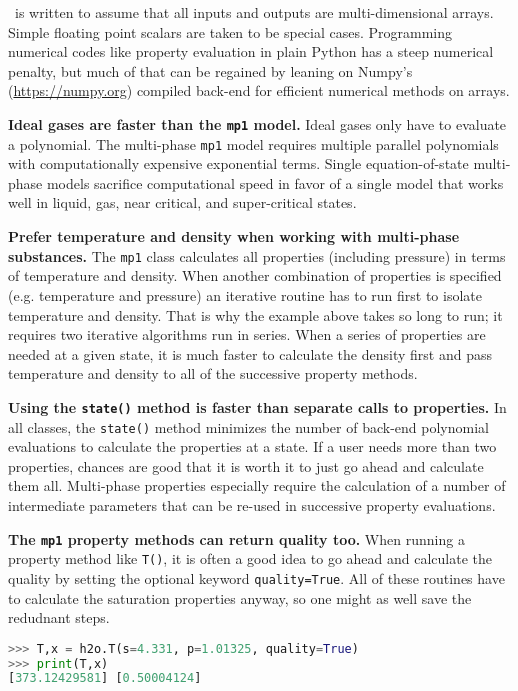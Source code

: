 \PM\ is written to assume that all inputs and outputs are multi-dimensional arrays.  Simple floating point scalars are taken to be special cases.  Programming numerical codes like property evaluation in plain Python has a steep numerical penalty, but much of that can be regained by leaning on Numpy's (\url{https://numpy.org}) compiled back-end for efficient numerical methods on arrays.

{\bf Ideal gases are faster than the \texttt{mp1} model.}  Ideal gases only have to evaluate a polynomial.  The multi-phase \texttt{mp1} model requires multiple parallel polynomials with computationally expensive exponential terms.  Single equation-of-state multi-phase models sacrifice computational speed in favor of a single model that works well in liquid, gas, near critical, and super-critical states.

{\bf Prefer temperature and density when working with multi-phase substances.}  The \texttt{mp1} class calculates all properties (including pressure) in terms of temperature and density.  When another combination of properties is specified (e.g. temperature and pressure) an iterative routine has to run first to isolate temperature and density.  That is why the example above takes so long to run; it requires two iterative algorithms run in series.  When a series of properties are needed at a given state, it is much faster to calculate the density first and pass temperature and density to all of the successive property methods.

{\bf Using the \texttt{state()} method is faster than separate calls to properties.}  In all classes, the \verb|state()| method minimizes the number of back-end polynomial evaluations to calculate the properties at a state.  If a user needs more than two properties, chances are good that it is worth it to just go ahead and calculate them all.  Multi-phase properties especially require the calculation of a number of intermediate parameters that can be re-used in successive property evaluations.

{\bf The \texttt{mp1} property methods can return quality too.}  When running a property method like \verb|T()|, it is often a good idea to go ahead and calculate the quality by setting the optional keyword \verb|quality=True|.  All of these routines have to calculate the saturation properties anyway, so one might as well save the redudnant steps.
\begin{lstlisting}[language=Python]
>>> T,x = h2o.T(s=4.331, p=1.01325, quality=True)
>>> print(T,x)
[373.12429581] [0.50004124]
\end{lstlisting}
